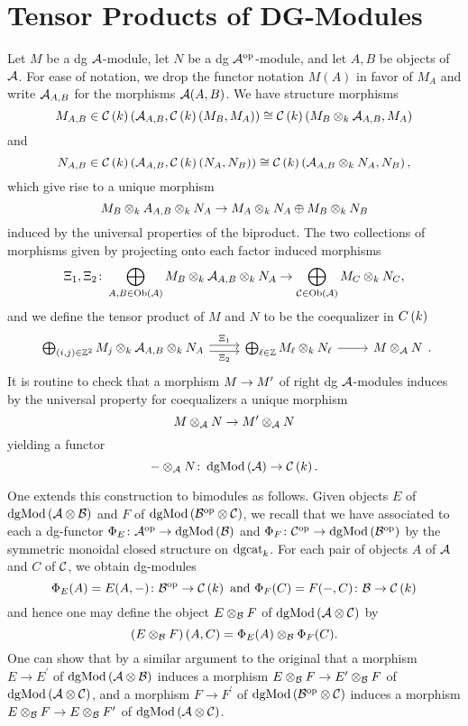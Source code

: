 \section{Tensor Products of DG-Modules}

Let \(M\) be a dg \(\mathcal{A}\)-module, let \(N\) be a dg \(\mathcal{A}^{{\operatorname{op}}}\)-module, and let \(A, B\) be objects of \(\mathcal{A}\).
For ease of notation, we drop the functor notation \(M(A)\) in favor of \(M_A\) and write \(\mathcal{A}_{A,B}\) for the morphisms \(\mathcal{A}(A, B)\).
We have structure morphisms
\[M_{A,B} \in \mathcal{C}\left(k\right)\left(\mathcal{A}_{A,B}, \mathcal{C}\left(k\right)(M_B, M_A)\right) \cong \mathcal{C}\left(k\right)\left(M_B \otimes_k \mathcal{A}_{A,B}, M_A\right)\]
and
\[N_{A,B} \in \mathcal{C}\left(k\right)\left(\mathcal{A}_{A,B}, \mathcal{C}\left(k\right)(N_A, N_B)\right) \cong \mathcal{C}\left(k\right)\left(\mathcal{A}_{A,B} \otimes_k N_A, N_B\right),\]
which give rise to a unique morphism
\[M_B \otimes_k {A}_{A,B} \otimes_k N_A \rightarrow M_A \otimes_k N_A \oplus M_B \otimes_k N_B\]
induced by the universal properties of the biproduct.
The two collections of morphisms given by projecting onto each factor induced morphisms 
\[\Xi_1, \Xi_2 \colon \bigoplus_{A,B \in \operatorname{Ob}(\mathcal{A})} M_B \otimes_k \mathcal{A}_{A,B} \otimes_k N_A \rightarrow \bigoplus_{\mathcal{C} \in \operatorname{Ob}(\mathcal{A})} M_C \otimes_k N_C,\]
and we define the tensor product of \(M\) and \(N\) to be the coequalizer in \(C\left(k\right)\)
\[\begin{tikzcd}
\bigoplus_{(i,j) \in \Z^2} M_j \otimes_k \A_{A,B} \otimes_k N_A \arrow[shift left]{r}{\Xi_1} \arrow[shift right,swap]{r}{\Xi_2} & \bigoplus_{\ell \in \Z} M_\ell \otimes_k N_\ell\arrow{r} & M \otimes_\A N
\end{tikzcd}.\]It is routine to check that a morphism \(M \rightarrow M^\prime\) of right dg \(\mathcal{A}\)-modules induces by the universal property for coequalizers a unique morphism
\[M \otimes_{\mathcal{A}} N \rightarrow M^\prime \otimes_{\mathcal{A}} N\]
yielding a functor
\[- \otimes_{\mathcal{A}} N \colon \operatorname{dgMod}\left(\mathcal{A}\right) \rightarrow \mathcal{C}\left(k\right).\]

One extends this construction to bimodules as follows.
Given objects \(E\) of \(\operatorname{dgMod}\left(\mathcal{A} \otimes \mathcal{B}\right)\) and \(F\) of \(\operatorname{dgMod}\left(\mathcal{B}^{{\operatorname{op}}} \otimes \mathcal{C}\right)\), we recall that we have associated to each a dg-functor \(\Phi_E \colon \mathcal{A}^{{\operatorname{op}}} \rightarrow \operatorname{dgMod}\left(\mathcal{B}\right)\) and \(\Phi_F \colon \mathcal{C}^{{\operatorname{op}}} \rightarrow \operatorname{dgMod}\left(\mathcal{B}^{{\operatorname{op}}}\right)\) by the symmetric monoidal closed structure on \(\operatorname{dgcat}_k\).
For each pair of objects \(A\) of \(\mathcal{A}\) and \(C\) of \(\mathcal{C}\), we obtain dg-modules
\[\Phi_E(A) = E(A, -) \colon \B^{\opp} \ra \CH{k}\ \text{and}\ \Phi_F(C) = F( -, C) \colon \B \ra \CH{k}\]
and hence one may define the object \(E \otimes_{\mathcal{B}} F\) of \(\operatorname{dgMod}\left(\mathcal{A} \otimes \mathcal{C}\right)\) by
\[\left(E \otimes_{\mathcal{B}} F\right)(A, C) = \Phi_E(A) \otimes_{\mathcal{B}} \Phi_F(C).\]
One can show that by a similar argument to the original that a morphism \(E \to E^\prime\) of \(\operatorname{dgMod}\left(\mathcal{A} \otimes \mathcal{B}\right)\) induces a morphism \(E \otimes_{\mathcal{B}} F \to E^\prime \otimes_{\mathcal{B}} F\) of \(\operatorname{dgMod}\left(\mathcal{A} \otimes \mathcal{C}\right)\), and a morphism \(F \to F^\prime\) of \(\operatorname{dgMod}\left(\mathcal{B}^{{\operatorname{op}}} \otimes \mathcal{C}\right)\) induces a morphism \(E \otimes_{\mathcal{B}} F \to E \otimes_{\mathcal{B}} F^\prime\) of \(\operatorname{dgMod}\left(\mathcal{A} \otimes \mathcal{C}\right)\).

